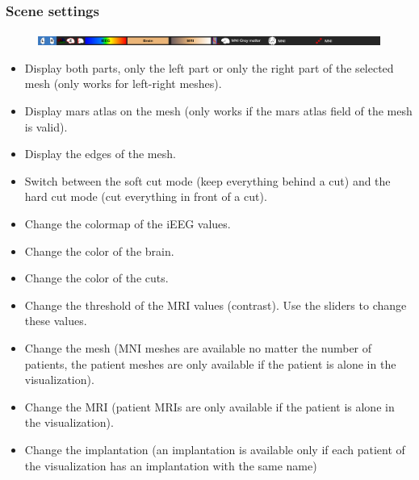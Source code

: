 \documentclass[a4paper]{article}
\begin{document}
\subsubsection{Scene settings}
\begin{figure}[H]
\begin{center}
\includegraphics[scale=0.45]{SceneSettings.png}
\end{center}
\end{figure}
\begin{itemize}
\item Display both parts, only the left part or only the right part of the selected mesh (only works for left-right meshes).
\item Display mars atlas on the mesh (only works if the mars atlas field of the mesh is valid).
\item Display the edges of the mesh.
\item Switch between the soft cut mode (keep everything behind a cut) and the hard cut mode (cut everything in front of a cut).
\item Change the colormap of the iEEG values.
\item Change the color of the brain.
\item Change the color of the cuts.
\item Change the threshold of the MRI values (contrast). Use the sliders to change these values.
\item Change the mesh (MNI meshes are available no matter the number of patients, the patient meshes are only available if the patient is alone in the visualization).
\item Change the MRI (patient MRIs are only available if the patient is alone in the visualization).
\item Change the implantation (an implantation is available only if each patient of the visualization has an implantation with the same name)
\end{itemize}
\end{document}

